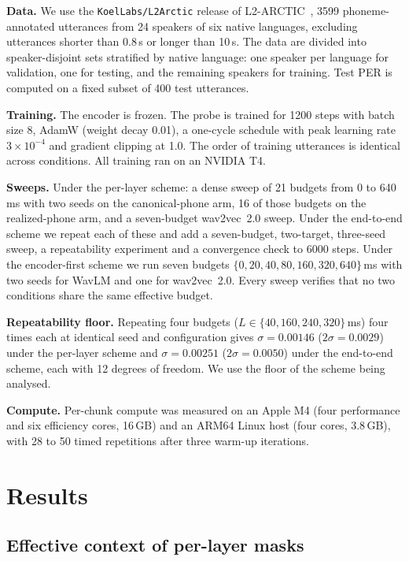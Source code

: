 \documentclass[journal]{IEEEtran}
\begin{document}
\textbf{Data.} We use the \texttt{KoelLabs/L2Arctic} release of
L2-ARCTIC~\cite{l2arctic2018}, 3599 phoneme-annotated utterances from 24
speakers of six native languages, excluding utterances shorter than 0.8\,s or
longer than 10\,s. The data are divided into speaker-disjoint sets stratified
by native language: one speaker per language for validation, one for testing,
and the remaining speakers for training. Test PER is computed on a fixed
subset of 400 test utterances.

\textbf{Training.} The encoder is frozen. The probe is trained for 1200 steps
with batch size 8, AdamW (weight decay 0.01), a one-cycle schedule with peak
learning rate $3\times10^{-4}$ and gradient clipping at 1.0. The order of
training utterances is identical across conditions. All training ran on an
NVIDIA T4.

\textbf{Sweeps.} Under the per-layer scheme: a dense sweep of 21 budgets from
0 to 640\,ms with two seeds on the canonical-phone arm, 16 of those budgets on
the realized-phone arm, and a seven-budget wav2vec~2.0 sweep. Under the
end-to-end scheme we repeat each of these and add a seven-budget,
two-target, three-seed sweep, a repeatability experiment and a convergence
check to 6000 steps. Under the encoder-first scheme we run seven budgets
$\{0,20,40,80,160,320,640\}$\,ms with two seeds for WavLM and one for
wav2vec~2.0. Every sweep verifies that no two conditions share the same
effective budget.

\textbf{Repeatability floor.} Repeating four budgets
($L\in\{40,160,240,320\}$\,ms) four times each at identical seed and
configuration gives $\sigma=0.00146$ ($2\sigma=0.0029$) under the per-layer
scheme and $\sigma=0.00251$ ($2\sigma=0.0050$) under the end-to-end scheme,
each with 12 degrees of freedom. We use the floor of the scheme being
analysed.

\textbf{Compute.} Per-chunk compute was measured on an Apple M4 (four
performance and six efficiency cores, 16\,GB) and an ARM64 Linux host (four
cores, 3.8\,GB), with 28 to 50 timed repetitions after three warm-up
iterations.

\section{Results}
\label{sec:results}

\subsection{Effective context of per-layer masks}
\label{sec:reach}
\end{document}
